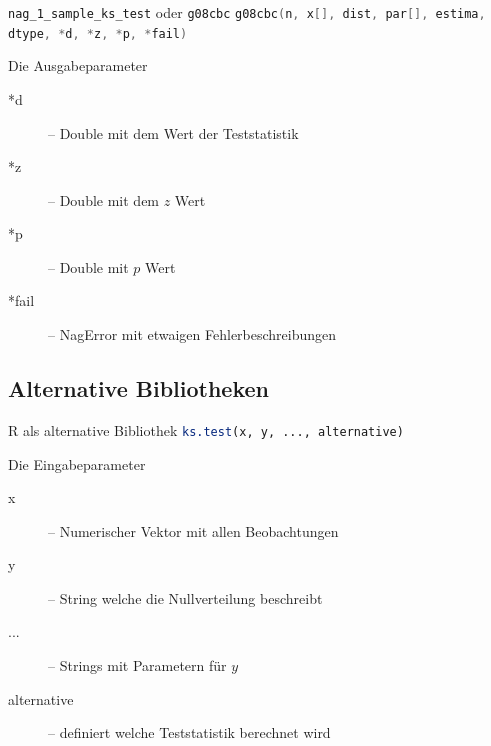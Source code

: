 \documentclass{beamer}
\begin{document}
\begin{frame}[fragile]{\insertsubsection}
\begin{block}{\lstinline[language=C++]$nag_1_sample_ks_test$ oder \lstinline[language=C++]$g08cbc$}
	\lstinline[language=C++]$g08cbc(n, x[], dist, par[], estima, dtype, *d, *z, *p, *fail)$
\end{block}
\begin{block}{Die Ausgabeparameter}
	\begin{description}
		\item[*d] -- Double mit dem Wert der Teststatistik
		\item[*z] -- Double mit dem $z$ Wert
		\item[*p] -- Double mit $p$ Wert
		\item[*fail] -- NagError mit etwaigen Fehlerbeschreibungen
	\end{description}
\end{block}
\end{frame}

\subsection{Alternative Bibliotheken}
\begin{frame}{\insertsubsection}

\begin{block}{R als alternative Bibliothek}
	\lstinline[language=R] $ks.test(x, y, ..., alternative)$
\end{block}

\begin{block}{Die Eingabeparameter}
\begin{description}
	\item[x] -- Numerischer Vektor mit  allen Beobachtungen
	\item[y] -- String welche die Nullverteilung beschreibt
	\item[...]-- Strings mit Parametern für $y$
	\item[alternative]-- definiert welche Teststatistik berechnet wird
\end{description}
\end{block}

\end{frame}
\end{document}

